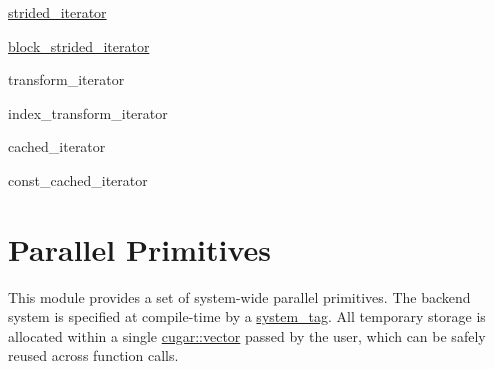 \begin{DoxyItemize}
\item \hyperlink{structcugar_1_1strided__iterator}{strided\+\_\+iterator}
\item \hyperlink{structcugar_1_1block__strided__iterator}{block\+\_\+strided\+\_\+iterator}
\item transform\+\_\+iterator
\item index\+\_\+transform\+\_\+iterator
\item cached\+\_\+iterator
\item const\+\_\+cached\+\_\+iterator 
\end{DoxyItemize}\hypertarget{primitives_page}{}\section{Parallel Primitives}\label{primitives_page}
This module provides a set of system-\/wide parallel primitives. The backend system is specified at compile-\/time by a \hyperlink{group___system_tags}{system\+\_\+tag}. All temporary storage is allocated within a single \hyperlink{structcugar_1_1vector}{cugar\+::vector} passed by the user, which can be safely reused across function calls.


